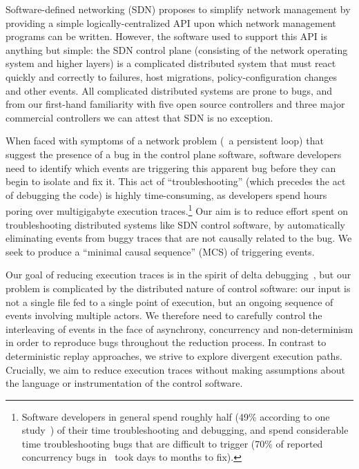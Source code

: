 Software-defined networking (SDN) proposes to simplify network management by
providing a simple logically-centralized API upon which network management
programs can be written. However, the software used to support this API is
anything but simple: the SDN control plane (consisting of the network
operating system and higher layers) is a complicated distributed system that
must react quickly and correctly to failures, host migrations,
policy-configuration changes and other events.
All complicated distributed systems are prone to bugs, and from our first-hand
familiarity with five open source controllers and three major commercial
controllers we can attest that SDN is no exception.

When faced with symptoms of a network problem (\eg~a persistent loop)
that suggest the presence of a bug in the control plane software,
software developers need to identify which events are triggering
this apparent bug before they can begin to isolate and fix it.
This act of ``troubleshooting'' (which precedes the act of debugging the
code) is highly time-consuming, as developers spend hours poring
over multigigabyte execution traces.\footnote{Software developers in general spend roughly half (49\% according to one
study~\cite{msoft_concurrency}) of their time troubleshooting and debugging, and spend
considerable time troubleshooting bugs that are difficult to trigger (70\% of reported concurrency bugs
in~\cite{msoft_concurrency} took days to months to fix).}
Our aim is to reduce effort spent on troubleshooting distributed systems like
SDN control software, by automatically eliminating
events from buggy traces that are not causally related to the bug. We seek to
produce a ``minimal
causal sequence'' (MCS) of triggering events.

Our goal of reducing execution traces is in the spirit of
delta debugging~\cite{Zeller:1999:YMP:318773.318946}, but our problem is
complicated by the distributed nature of control software:
our input is not a single file fed to a single point of execution, but an ongoing
sequence of events involving
multiple actors. We therefore need to carefully
control the interleaving of events in the face of asynchrony, concurrency and non-determinism in
order to reproduce bugs throughout the reduction process.
In contrast to deterministic replay
approaches, we strive to explore divergent execution paths. Crucially, we aim to
reduce execution traces without making assumptions about the language
or instrumentation of the control software.

